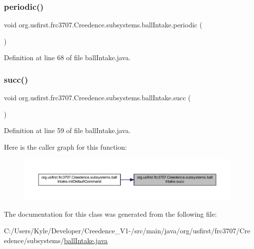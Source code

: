 \subsubsection{\texorpdfstring{periodic()}{periodic()}}
{\footnotesize\ttfamily void org.\+usfirst.\+frc3707.\+Creedence.\+subsystems.\+ball\+Intake.\+periodic (\begin{DoxyParamCaption}{ }\end{DoxyParamCaption})}



Definition at line 68 of file ball\+Intake.\+java.

\mbox{\label{classorg_1_1usfirst_1_1frc3707_1_1_creedence_1_1subsystems_1_1ball_intake_af06c54b7f657477e9e028dd792c279a9}} 
\subsubsection{\texorpdfstring{succ()}{succ()}}
{\footnotesize\ttfamily void org.\+usfirst.\+frc3707.\+Creedence.\+subsystems.\+ball\+Intake.\+succ (\begin{DoxyParamCaption}{ }\end{DoxyParamCaption})}



Definition at line 59 of file ball\+Intake.\+java.

Here is the caller graph for this function\+:
\nopagebreak
\begin{figure}[H]
\begin{center}
\leavevmode
\includegraphics[width=350pt]{classorg_1_1usfirst_1_1frc3707_1_1_creedence_1_1subsystems_1_1ball_intake_af06c54b7f657477e9e028dd792c279a9_icgraph}
\end{center}
\end{figure}


The documentation for this class was generated from the following file\+:\begin{DoxyCompactItemize}
\item 
C\+:/\+Users/\+Kyle/\+Developer/\+Creedence\+\_\+\+V1-\//src/main/java/org/usfirst/frc3707/\+Creedence/subsystems/\mbox{\hyperlink{ball_intake_8java}{ball\+Intake.\+java}}\end{DoxyCompactItemize}

